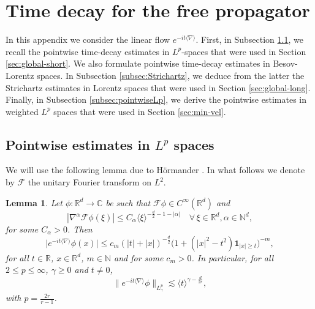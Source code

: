 \documentclass[12pt]{article}
\newcommand{\R}{\mathbb{R}}
\newcommand{\N}{\mathbb{N}}
\theoremstyle{plain}
\newtheorem{lemma}[theo]{Lemma}
\begin{document}
	
	
	\section{Time decay for the free propagator}
	\label{app: pointw dec} In this appendix we 
	consider the linear flow $e^{-it\langle\nabla \rangle }$. First, in Subsection \ref{subsec:Lp-time-decay}, we recall the pointwise time-decay estimates in $L^p$-spaces that were used in Section \ref{sec:global-short}. We also formulate pointwise time-decay estimates in Besov-Lorentz spaces. In Subsection \ref{subsec:Strichartz}, we deduce from the latter the Strichartz estimates in Lorentz spaces that were used in Section \ref{sec:global-long}. Finally, in Subsection \ref{subsec:pointwiseLp}, we derive the pointwise estimates in weighted $L^p$ spaces that were used in Section \ref{sec:min-vel}.
	
	\subsection{Pointwise estimates in $L^p$ spaces}\label{subsec:Lp-time-decay}
	We will use the following lemma due to H\"ormander \cite{Hormander_book_hyperbolic}. In what follows we denote by $\mathcal{F}$ the unitary Fourier transform on $L^2$.
	
	\begin{lemma}
		\label{lemma: ancona f}
		Let $\phi :\R^ d \to \mathbb{C}$ be such that $\mathcal F \phi  \in C^\infty (\R^d)$ and 
		\begin{equation*}
			|\nabla^\alpha\mathcal F \phi(\xi) |\leq C_\alpha \langle \xi \rangle^{-\frac{d}2 - 1 - |\alpha|}	\quad \forall\, \xi \in \R^d, \alpha\in \N^d,
		\end{equation*}
		for some $C_\alpha>0$. Then 
		\begin{equation}\label{eq:bound-Hormander}
			\big|e^{-it\langle \nabla \rangle } \phi(x)\big| \leq c_m(|t| + |x|)^{-\frac{d}2}\big(1+(|x|^2-t^2)\mathbf{1}_{|x|\ge t}\big)^{-m},
		\end{equation}
		for all $ t \in \R$, $x\in\R^d$, $m\in\mathbb{N}$ and for some $c_m>0$. In particular, for all $2\le p\le\infty$, $\gamma\ge0$ and $t\neq0$,
		\begin{equation}\label{eq:bound-phi-Lp}
		    \| e^{-it\langle\nabla\rangle}\phi\|_{L^p_\gamma}\lesssim\langle t\rangle^{\gamma-\frac{d}{2r}},
		\end{equation}
		with $p=\frac{2r}{r-1}$.
	\end{lemma}
	
\end{document}
